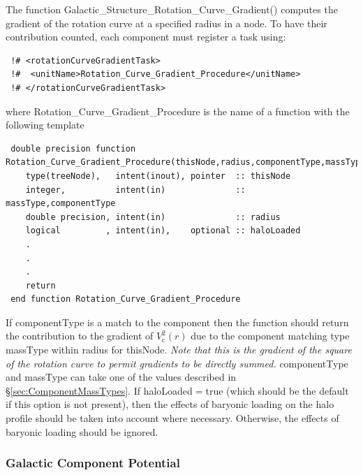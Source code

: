 The function {\normalfont \ttfamily Galactic\_Structure\_Rotation\_Curve\_Gradient()} computes the gradient of the rotation curve at a specified radius in a node. To have their contribution counted, each component must register a task using:
\begin{verbatim}
 !# <rotationCurveGradientTask>
 !#  <unitName>Rotation_Curve_Gradient_Procedure</unitName>
 !# </rotationCurveGradientTask>
\end{verbatim}
where {\normalfont \ttfamily Rotation\_Curve\_Gradient\_Procedure} is the name of a function with the following template
\begin{verbatim}
 double precision function Rotation_Curve_Gradient_Procedure(thisNode,radius,componentType,massType,haloLoaded)
    type(treeNode),   intent(inout), pointer  :: thisNode
    integer,          intent(in)              :: massType,componentType
    double precision, intent(in)              :: radius
    logical         , intent(in),    optional :: haloLoaded
    .
    .
    .
    return
 end function Rotation_Curve_Gradient_Procedure
\end{verbatim}
If {\normalfont \ttfamily componentType} is a match to the component then the function should return the contribution to the gradient of $V_\mathrm{c}^2(r)$ due to the component matching type {\normalfont \ttfamily massType} within {\normalfont \ttfamily radius} for {\normalfont \ttfamily thisNode}. \emph{Note that this is the gradient of the square of the rotation curve to permit gradients to be directly summed.} {\normalfont \ttfamily componentType} and {\normalfont \ttfamily massType} can take one of the values described in \S\ref{sec:ComponentMassTypes}. If {\normalfont \ttfamily haloLoaded}$=${\normalfont \ttfamily true} (which should be the default if this option is not present), then the effects of baryonic loading on the halo profile should be taken into account where necessary. Otherwise, the effects of baryonic loading should be ignored.

\subsubsection{Galactic Component Potential}

